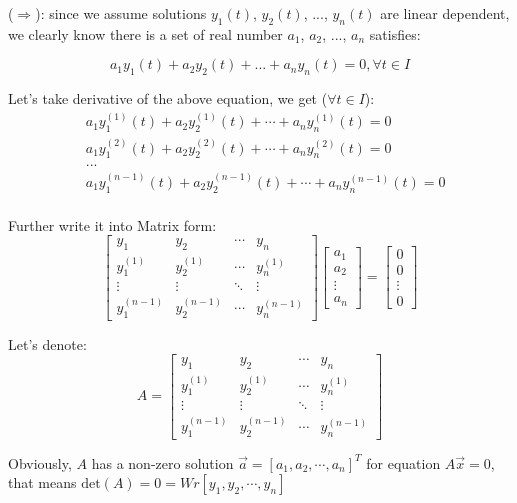 \documentclass{article}
\begin{document}
($\Rightarrow$): since we assume solutions $y_{1}(t)$, $y_{2}(t)$, ..., $y_{n}(t)$ are linear dependent, we clearly know there is a set of real number $a_{1}$, $a_{2}$, ..., $a_{n}$ satisfies:

$$a_{1}y_{1}(t) + a_{2}y_{2}(t) + ... + a_{n}y_{n}(t) = 0, \forall t \in I$$

Let's take derivative of the above equation, we get ($\forall t \in I$):
$$
\begin{aligned}
&a_{1}y_{1}^{(1)}(t) + a_{2}y_{2}^{(1)}(t) + \cdots + a_{n}y_{n}^{(1)}(t) = 0 \\
&a_{1}y_{1}^{(2)}(t) + a_{2}y_{2}^{(2)}(t) + \cdots + a_{n}y_{n}^{(2)}(t) = 0 \\
&... \\
&a_{1}y_{1}^{(n-1)}(t) + a_{2}y_{2}^{(n-1)}(t) + \cdots + a_{n}y_{n}^{(n-1)}(t) = 0 \\
\end{aligned}
$$

Further write it into Matrix form:
$$
\begin{bmatrix}
y_{1} & y_{2} & \cdots & y_{n} \\
y_{1}^{(1)} & y_{2}^{(1)} & \cdots & y_{n}^{(1)} \\
\vdots & \vdots & \ddots & \vdots \\
y_{1}^{(n-1)} & y_{2}^{(n-1)} & \cdots & y_{n}^{(n-1)}
\end{bmatrix} \begin{bmatrix} a_{1} \\ a_{2} \\ \vdots \\ a_{n} \end{bmatrix} = 
\begin{bmatrix} 0 \\ 0 \\ \vdots \\ 0 \end{bmatrix}
$$

Let's denote:
$$
A = \begin{bmatrix}
y_{1} & y_{2} & \cdots & y_{n} \\
y_{1}^{(1)} & y_{2}^{(1)} & \cdots & y_{n}^{(1)} \\
\vdots & \vdots & \ddots & \vdots \\
y_{1}^{(n-1)} & y_{2}^{(n-1)} & \cdots & y_{n}^{(n-1)}
\end{bmatrix}
$$

Obviously, $A$ has a non-zero solution $\vec{a} = [a_{1}, a_{2}, \cdots, a_{n}]^{T}$ for equation $A\vec{x} = 0$, that means $\mathrm{det}(A) = 0 = Wr[y_{1}, y_{2}, \cdots, y_{n}]$
\end{document}
